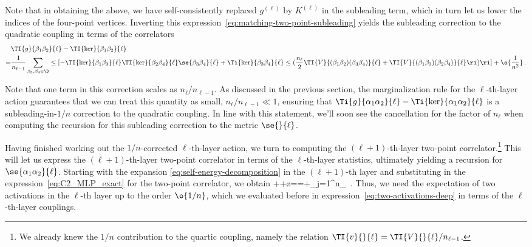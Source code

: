 \ee
Note that in obtaining the above, we have self-consistently replaced $g^{(\ell)}$ by $K^{(\ell)}$ in the subleading term, which in turn let us lower the indices of the four-point vertices.
Inverting this expression~\eqref{eq:matching-two-point-subleading} yields the subleading correction to the quadratic coupling in terms of the correlators
\begin{align}\label{eq:inverse-difference}
&\TI{g}{\beta_1\beta_2}{\ell}-\TI{\ker}{\beta_1\beta_2}{\ell}\, \\
=&\frac{1}{n_{\ell-1}}\sum_{\beta_3,\beta_4\in\D}\le[-\TI{\ker}{\beta_1\beta_3}{\ell}\TI{\ker}{\beta_2\beta_4}{\ell}\se{\beta_3\beta_4}{\ell}+\Ti{\ker}{\beta_3\beta_4}{\ell}\le(\frac{n_{\ell}}{2} \TI{V}{(\beta_1\beta_2)(\beta_3\beta_4)}{\ell}+\TI{V}{(\beta_1\beta_3)(\beta_2\beta_4)}{\ell}\ri)\ri]+\o{\frac{1}{n^2}}\, .\nonumber
\end{align}

Note that one term in this correction scales as $n_\ell / n_{\ell-1}$. As discussed in the previous section, the marginalization rule for the $\ell$-th-layer action guarantees that we can treat this quantity as small, $n_\ell / n_{\ell-1} \ll 1$, ensuring that $\Ti{g}{\alpha_1\alpha_2}{\ell}-\Ti{\ker}{\alpha_1\alpha_2}{\ell}$ is a subleading-in-$1/n$ correction to the quadratic coupling. In line with this statement, we'll soon see the cancellation for the factor of $n_{\ell}$ when computing the recursion for this subleading correction to the metric $\se{}{\ell}$.



Having finished working out the $1/n$-corrected $\ell$-th-layer action, we turn to computing the $(\ell+1)$-th-layer two-point correlator.\footnote{We already knew the $1/n$ contribution to the quartic coupling, namely the relation $\TI{v}{}{\ell} = \TI{V}{}{\ell}/n_{\ell-1}$.} This will let us express the $(\ell+1)$-th-layer two-point correlator in terms of the $\ell$-th-layer statistics, ultimately yielding a recursion for $\se{\alpha_1\alpha_2}{\ell}$.
Starting with the expansion \eqref{eq:self-energy-decomposition} in the $(\ell+1)$-th layer  and substituting in the expression~\eqref{eq:C2_MLP_exact} for the two-point correlator, we obtain
\be\label{eq:recursion-two-point-subleading}
++\o{}==+\sum_{j=1}^{n_{\ell}}\, .
\ee
Thus, we need the expectation of two activations in the $\ell$-th layer up to the order $\o{1/n}$, which we evaluated before in expression~\eqref{eq:two-activations-deep} in terms of the $\ell$-th-layer couplings.

